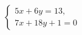 \begin{ex}
	\begin{condition}
		\( \left\{
		\begin{array}{l}
			5x+6y=13,\\
			7x+18y+1=0
		\end{array}
		\right. \)
	\end{condition}
\end{ex}